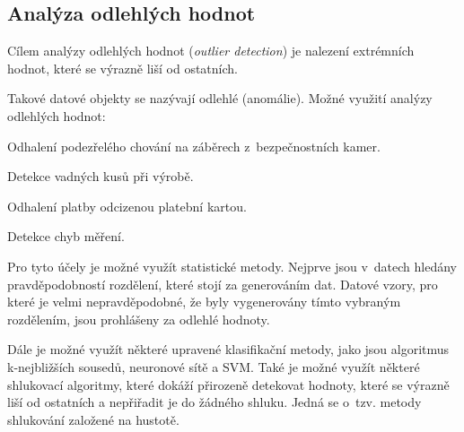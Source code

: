 \subsection{Analýza odlehlých hodnot}

\begin{compactitem}
    \item Cílem analýzy odlehlých hodnot (\textit{outlier detection}) je nalezení extrémních hodnot, které se výrazně liší od ostatních.

    \item Takové datové objekty se nazývají odlehlé (anomálie). Možné využití analýzy odlehlých hodnot: \begin{compactitem}
        \item Odhalení podezřelého chování na záběrech z~bezpečnostních kamer.

        \item Detekce vadných kusů při výrobě.

        \item Odhalení platby odcizenou platební kartou.

        \item Detekce chyb měření.
    \end{compactitem}

    \item Pro tyto účely je možné využít statistické metody. Nejprve jsou v~datech hledány pravděpodobností rozdělení, které stojí za generováním dat. Datové vzory, pro které je velmi nepravděpodobné, že byly vygenerovány tímto vybraným rozdělením, jsou prohlášeny za odlehlé hodnoty.

    \item Dále je možné využít některé upravené klasifikační metody, jako jsou algoritmus k-nejbližších sousedů, neuronové sítě a SVM. Také je možné využít některé shlukovací algoritmy, které dokáží přirozeně detekovat hodnoty, které se výrazně liší od ostatních a nepřiřadit je do žádného shluku. Jedná se o~tzv. metody shlukování založené na hustotě.
\end{compactitem}
